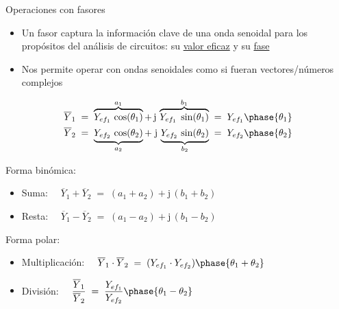\documentclass[aspectratio=169, usenames,svgnames,dvipsnames]{beamer}
\begin{document}
\begin{frame}{Operaciones con fasores}
    \begin{itemize}       
        \item Un fasor \alert{captura la información clave de una onda senoidal} para los propósitos del análisis de circuitos: su \underline{valor eficaz} y su \underline{fase} 

        \vspace{1mm}
        \item Nos permite \alert{operar con ondas senoidales como si fueran vectores/números complejos}
    \end{itemize}     
    \vspace*{-7mm}
    \begin{align*}
        \overline{Y}_1 & \; = \; 
        \overbrace{Y_{ef_1}\,\cos(\theta_1)}^{a_1}+\,\mathrm{j}\,\overbrace{Y_{ef_1}\;\sin(\theta_1)}^{b_1} 
        \; = \; 
        Y_{ef_1}\phase{\theta_1}\\
        \overline{Y}_2 & \; = \; \underbrace{Y_{ef_2}\,\cos(\theta_2)}_{a_2}+\;\mathrm{j}\,\underbrace{Y_{ef_2}\,\sin(\theta_2)}_{b_2}
        \; = \; 
        Y_{ef_2}\phase{\theta_2}
    \end{align*}
    
    \vspace*{-6mm}
    Forma binómica:

    \vspace*{-1mm}
    \begin{itemize}
        \item Suma: $\quad \overline{Y}_1+\overline{Y}_2 \; = \; (a_1+a_2)+\mathrm{j}\,(b_1+b_2)$

        \vspace{2mm}
        \item Resta: $\quad \overline{Y}_1-\overline{Y}_2 \; = \; (a_1-a_2)+\mathrm{j}\,(b_1-b_2)$
    \end{itemize}
    Forma polar:
    \begin{itemize}
        \item Multiplicación: $\quad \overline{Y}_1\cdot \overline{Y}_2 \; = \; (Y_{ef_1}\cdot Y_{ef_2})\phase{\theta_1+\theta_2}$
        \item División: $\quad \dfrac{\overline{Y}_1}{\overline{Y}_2} \; = \; \dfrac{Y_{ef_1}}{Y_{ef_2}}\phase{\theta_1-\theta_2}$
    \end{itemize}    
\end{frame}

\end{document}
